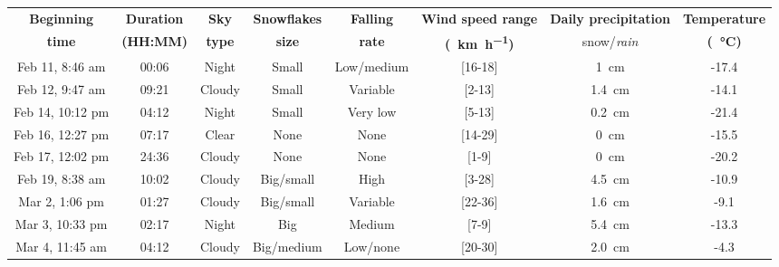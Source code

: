 \begin{table}[htbp]
    \centering
    \begin{tabular}{|c|c|c|c|c|c|c|c|}
        \hline
        \textbf{Beginning} & \textbf{Duration} & \textbf{Sky}  & \textbf{Snowflakes} & \textbf{Falling} & \textbf{Wind speed range}      & \textbf{Daily precipitation}  & \textbf{Temperature}     \\
        \textbf{time}      & \textbf{(HH:MM)}  & \textbf{type} & \textbf{size}       & \textbf{rate}    & \textbf{(\SI{}{\km\per\hour})} & snow/\textit{rain}            & \textbf{(\SI{}{\celsius})}      \\\hline
        Feb 11, 8:46 am    &  00:06            & Night         & Small               & Low/medium       & [16-18]                        & \SI{1}{\cm}                   & -17.4 \\\hline
        Feb 12, 9:47 am    &  09:21            & Cloudy        & Small               & Variable         & [2-13]                         & \SI{1.4}{\cm}                 & -14.1 \\\hline
        Feb 14, 10:12 pm   &  04:12            & Night         & Small               & Very low         & [5-13]                         & \SI{0.2}{\cm}                 & -21.4 \\\hline
        Feb 16, 12:27 pm   &  07:17            & Clear         & None                & None             & [14-29]                        & \SI{0}{\cm}                   & -15.5 \\\hline
        Feb 17, 12:02 pm   &  24:36            & Cloudy        & None                & None             & [1-9]                          & \SI{0}{\cm}                   & -20.2 \\\hline
        Feb 19, 8:38 am    &  10:02            & Cloudy        & Big/small           & High             & [3-28]                         & \SI{4.5}{\cm}                 & -10.9 \\\hline
        Mar 2, 1:06 pm     &  01:27            & Cloudy        & Big/small           & Variable         & [22-36]                        & \SI{1.6}{\cm}                 & -9.1  \\\hline
        Mar 3, 10:33 pm    &  02:17            & Night         & Big                 & Medium           & [7-9]                          & \SI{5.4}{\cm}                 & -13.3 \\\hline
        Mar 4, 11:45 am    &  04:12            & Cloudy        & Big/medium          & Low/none         & [20-30]                        & \SI{2.0}{\cm}                 & -4.3  \\\hline

\end{tabular}
\end{table}
